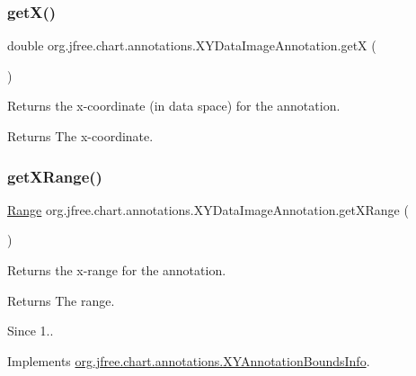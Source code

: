 \subsubsection{\texorpdfstring{get\+X()}{getX()}}
{\footnotesize\ttfamily double org.\+jfree.\+chart.\+annotations.\+X\+Y\+Data\+Image\+Annotation.\+getX (\begin{DoxyParamCaption}{ }\end{DoxyParamCaption})}

Returns the x-\/coordinate (in data space) for the annotation.

\begin{DoxyReturn}{Returns}
The x-\/coordinate. 
\end{DoxyReturn}
\mbox{\label{classorg_1_1jfree_1_1chart_1_1annotations_1_1_x_y_data_image_annotation_a62369979a4929b029c8dd82b98f98760}} 
\subsubsection{\texorpdfstring{get\+X\+Range()}{getXRange()}}
{\footnotesize\ttfamily \mbox{\hyperlink{classorg_1_1jfree_1_1data_1_1_range}{Range}} org.\+jfree.\+chart.\+annotations.\+X\+Y\+Data\+Image\+Annotation.\+get\+X\+Range (\begin{DoxyParamCaption}{ }\end{DoxyParamCaption})}

Returns the x-\/range for the annotation.

\begin{DoxyReturn}{Returns}
The range.
\end{DoxyReturn}
\begin{DoxySince}{Since}
1.. 
\end{DoxySince}


Implements \mbox{\hyperlink{interfaceorg_1_1jfree_1_1chart_1_1annotations_1_1_x_y_annotation_bounds_info_ae18c2d2a5ecd5f0dfc03d7b3e3240000}{org.\+jfree.\+chart.\+annotations.\+X\+Y\+Annotation\+Bounds\+Info}}.

\mbox{\label{classorg_1_1jfree_1_1chart_1_1annotations_1_1_x_y_data_image_annotation_a0808ab6c019d68adf483f459cc685fe9}} 
